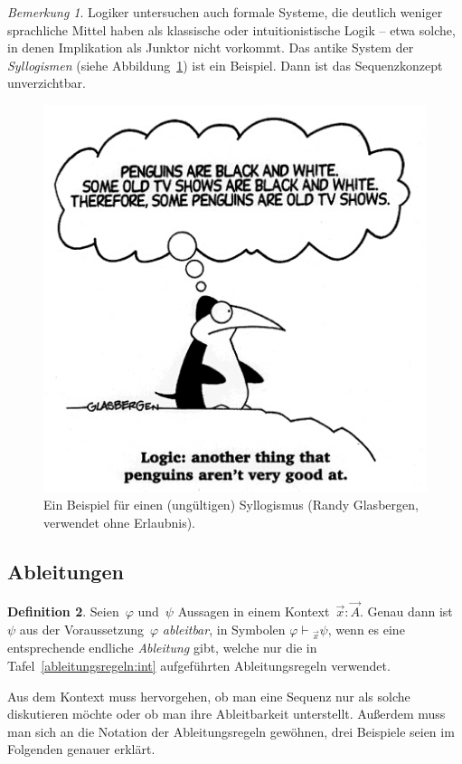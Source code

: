 \documentclass[a4paper,ngerman,12pt]{scrartcl}
\theoremstyle{definition}
\newtheorem{defn}{Definition}[section]
\theoremstyle{plain}
\theoremstyle{remark}
\newtheorem{bem}[defn]{Bemerkung}
\newcommand{\seq}[1]{\mathrel{\vdash\!\!\!_{#1}}}
\renewcommand{\_}{\mathpunct{.}\,}
\newcommand{\?}{\,{:}\,}
\begin{document}
\begin{bem}Logiker untersuchen auch formale Systeme, die deutlich weniger
sprachliche Mittel haben als klassische oder intuitionistische Logik -- etwa
solche, in denen Implikation als Junktor nicht vorkommt. Das antike System der
\emph{Syllogismen} (siehe Abbildung~\ref{penguin-logic})
ist ein Beispiel. Dann ist das Sequenzkonzept unverzichtbar.
\end{bem}
\begin{figure}
  \centering
  \includegraphics[scale=0.5]{penguin-logic}
  \caption{\label{penguin-logic}Ein Beispiel für einen (ungültigen)
  Syllogismus (Randy Glasbergen, verwendet ohne Erlaubnis).}
\end{figure}


\subsection{Ableitungen}

\begin{defn}Seien~$\varphi$ und~$\psi$ Aussagen in einem Kontext~$\vec x : \vec
A$. Genau dann ist~$\psi$ aus der Voraussetzung~$\varphi$ \emph{ableitbar}, in
Symbolen
$\varphi \seq{\vec x} \psi$,
wenn es eine entsprechende endliche \emph{Ableitung} gibt, welche nur die
in Tafel~\ref{ableitungsregeln:int} aufgeführten Ableitungsregeln verwendet.
\end{defn}

Aus dem Kontext muss hervorgehen, ob man eine Sequenz nur als solche
diskutieren möchte oder ob man ihre Ableitbarkeit unterstellt. Außerdem muss
man sich an die Notation der Ableitungsregeln gewöhnen, drei Beispiele seien im
Folgenden genauer erklärt.
\end{document}
